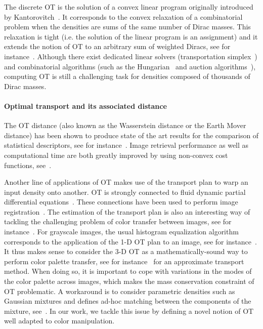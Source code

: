 The discrete OT is the solution of a convex linear program originally introduced by Kantorovitch~\cite{Kantorovitch-OT}. It corresponds to the convex relaxation of a combinatorial problem when the densities are sums of the same number of Dirac masses. This relaxation is tight (i.e. the solution of the linear program is an assignment) and it extends the notion of OT to an arbitrary sum of weighted Diracs, see for instance~\cite{Villani03}. Although there exist dedicated linear solvers (transportation simplex~\cite{Dantzig-Book}) and combinatorial algorithms (such as the Hungarian~\cite{Kuhn-hungarian} and auction algorithms~\cite{Bertsekas1988}), computing OT is still a challenging task for densities composed of thousands of Dirac masses. 

\paragraph{Optimal transport and its associated distance}

The OT distance (also known as the Wasserstein distance or the Earth Mover distance) has been shown to produce state of the art results for the comparison of statistical descriptors, see for instance~\cite{Rubner98}. Image retrieval performance as well as computational time are both greatly improved by using non-convex cost functions, see~\cite{Pele-ICCV}. 

Another line of applications of OT makes use of the transport plan to warp an input density onto another. OT is strongly connected to fluid dynamic partial differential equations~\cite{Benamou00}. These connections have been used to perform image registration~\cite{haker-ijcv}.  The estimation of the transport plan is also an interesting way of tackling  the challenging problem of color transfer between images, see for instance~\cite{Reinhard01,Morovic03,McCollum07}. For grayscale images, the usual histogram equalization algorithm corresponds to the application of the 1-D OT plan to an image, see for instance~\cite{Delon04}. It thus makes sense to consider the 3-D OT as a mathematically-sound way to perform color palette transfer, see for instance~\cite{Pitie07} for an approximate transport method. When doing so, it is important to cope with variations in the modes of the color palette across images, which makes the mass conservation constraint of OT problematic. A workaround is to consider parametric densities such as Gaussian mixtures and defines ad-hoc matching between the components of the mixture, see~\cite{Tai-cvpr-colortransfer}. In our work, we tackle this issue by defining a novel notion of OT well adapted to color manipulation. 

